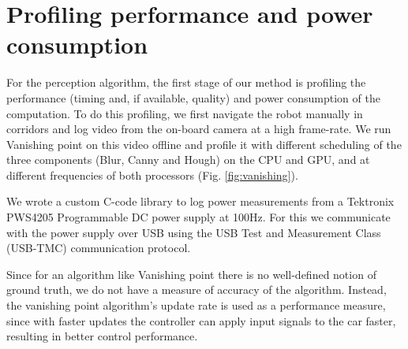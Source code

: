 \section{Profiling performance and power consumption}

For the perception algorithm, the first stage of our method is profiling the performance (timing and, if available, quality) and power consumption of the computation. 
To do this profiling, we first navigate the robot manually in corridors and log video from the on-board camera at a high frame-rate. 
We run Vanishing point on this video offline and profile it with different scheduling of the three components (Blur, Canny and Hough) on the CPU and GPU, and at different frequencies of both processors (Fig. \ref{fig:vanishing}).

We wrote a custom C-code library to log power measurements from a Tektronix PWS4205 Programmable DC power supply at 100Hz. 
For this we communicate with the power supply over USB using the USB Test and Measurement Class (USB-TMC) communication protocol. 

Since for an algorithm like Vanishing point there is no well-defined notion of ground truth, we do not have a measure of accuracy of the algorithm. 
Instead, the vanishing point algorithm's update rate is used as a performance measure, since with faster updates the controller can apply input signals to the car faster, resulting in better control performance. 



